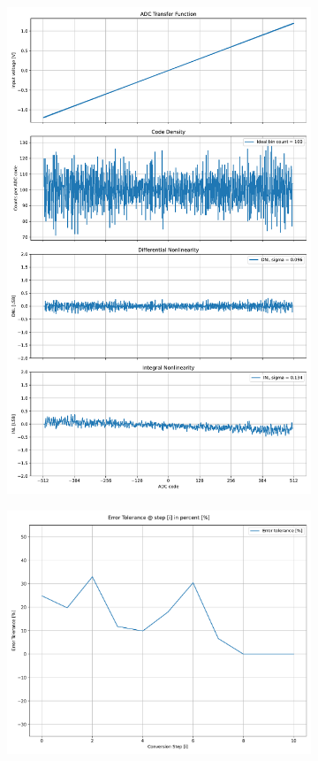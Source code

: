 \documentclass[varwidth]{standalone}
\begin{document}
\begin{figure}
\begin{subfigure}{0.32\textwidth}
    \includegraphics[width=\textwidth]{behavioral_10b_noisy_scadec_nonlinearity.pdf}
\end{subfigure}
\begin{subfigure}{0.32\textwidth}
    \includegraphics[width=\textwidth]{behavioral_10b_noisy_scadec_redundancy.pdf}

\end{subfigure}
\end{figure}
\end{document}

